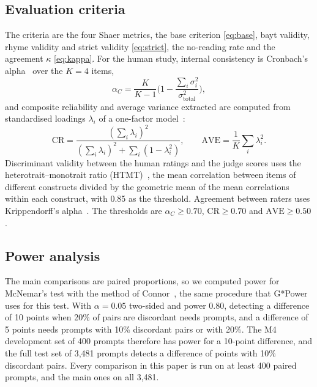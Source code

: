 \subsection{Evaluation criteria}
The criteria are the four Shaer metrics, the base criterion \eqref{eq:base}, bayt validity, rhyme validity and strict
validity \eqref{eq:strict}, the no-reading rate and the agreement $\kappa$ \eqref{eq:kappa}. For the human study,
internal consistency is Cronbach's alpha~\cite{cronbach1951alpha} over the $K=4$ items,
\begin{equation}
\alpha_C = \frac{K}{K-1}\Big(1 - \frac{\sum_{i}\sigma^2_i}{\sigma^2_{\text{total}}}\Big),
\label{eq:alpha}
\end{equation}
and composite reliability and average variance extracted are computed from standardised loadings $\lambda_i$ of a
one-factor model~\cite{fornell1981evaluating}:
\begin{equation}
\mathrm{CR} = \frac{(\sum_i \lambda_i)^2}{(\sum_i \lambda_i)^2 + \sum_i (1-\lambda_i^2)}, \qquad
\mathrm{AVE} = \frac{1}{K}\sum_i \lambda_i^2 .
\label{eq:crave}
\end{equation}
Discriminant validity between the human ratings and the judge scores uses the heterotrait--monotrait ratio
(HTMT)~\cite{henseler2015htmt}, the mean correlation between items of different constructs divided by the geometric mean
of the mean correlations within each construct, with 0.85 as the threshold. Agreement between raters uses
Krippendorff's alpha~\cite{hayes2007krippendorff}. The thresholds are $\alpha_C \ge 0.70$, $\mathrm{CR} \ge 0.70$ and
$\mathrm{AVE} \ge 0.50$.

\subsection{Power analysis}
\label{sec:power}
The main comparisons are paired proportions, so we computed power for McNemar's test with the method of
Connor~\cite{connor1987sample}, the same procedure that G*Power~\cite{faul2007gpower} uses for this test. With
$\alpha=0.05$ two-sided and power 0.80, detecting a difference of 10 points when 20\% of pairs are discordant needs
 prompts, and a difference of 5 points needs  prompts with 10\% discordant pairs or
 with 20\%. The M4 development set of 400 prompts therefore has power  for a 10-point
difference, and the full test set of 3,481 prompts detects a difference of  points with 10\% discordant
pairs. Every comparison in this paper is run on at least 400 paired prompts, and the main ones on all 3,481.
